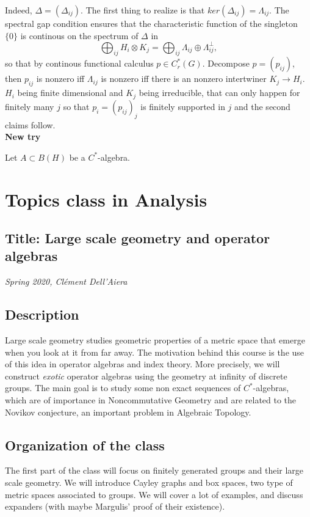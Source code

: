 Indeed, $\Delta= (\Delta_{ij})$.
The first thing to realize is that $ker(\Delta_{ij})=\Lambda_{ij}$. The spectral gap condition ensures that the characteristic function of the singleton $\{0\}$ is continous on the spectrum of $\Delta$ in 
\[\bigoplus_{ij} H_i \otimes K_j = \bigoplus_{ij} \Lambda_{ij} \oplus \Lambda_{ij}^{\perp}, \]
so that by continous functional calculus $p \in C_r^*(G)$. Decompose $p =(p_{ij})$, then $p_{ij}$ is nonzero iff $\Lambda_{ij}$ is nonzero iff there is an nonzero intertwiner $K_j \rightarrow H_i$. $H_i$ being finite dimensional and $K_j$ being irreducible, that can only happen for finitely many $j$ so that $p_i =(p_{ij})_j$ is finitely supported in $j$ and the second claims follow. \\
\textbf{New try}

Let $A\subset B(H)$ be a $C^\ast$-algebra.


\newpage

\section{Topics class in Analysis}

\subsection*{Title: Large scale geometry and operator algebras}
\textit{Spring 2020, Cl\'ement Dell'Aiera}
\subsection*{Description} 
Large scale geometry studies geometric properties of a metric space that emerge when you look at it from far away. The motivation behind this course is the use of this idea in operator algebras and index theory. More precisely, we will construct \textit{exotic} operator algebras using the geometry at infinity of discrete groups. The main goal is to study some non exact sequences of $C^*$-algebras, which are of importance in Noncommutative Geometry and are related to the Novikov conjecture, an important problem in Algebraic Topology.

\subsection*{Organization of the class}
The first part of the class will focus on finitely generated groups and their large scale geometry. We will introduce Cayley graphs and box spaces, two type of metric spaces associated to groups. We will cover a lot of examples, and discuss expanders (with maybe Margulis' proof of their existence).\\

